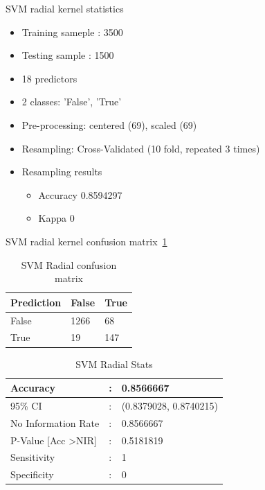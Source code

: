 			SVM radial kernel statistics
				\begin{itemize}
					\item Training sameple : 	3500
					\item Testing sample : 1500
					\item 18 predictors
					\item 2 classes: 'False', 'True' 
					\item Pre-processing: centered (69), scaled (69) 
					\item Resampling: Cross-Validated (10 fold, repeated 3 times) 
					\item Resampling results
					\begin{itemize}
						\item Accuracy  0.8594297
						\item Kappa      0
					\end{itemize}
				\end{itemize}
				
				SVM radial kernel confusion matrix~\ref{svm-r-cm}
					\begin{table}[H]
						\centering
						\caption{SVM Radial confusion matrix}
						\label{svm-r-cm}
						\begin{tabular}{lll}
							\hline
							Prediction & False & True \\
							\hline
							False & 1266 & 68 \\
							\hline
							True & 19 & 147 \\
							\hline
						\end{tabular}
						
					\end{table}
						\begin{table}[H]
							\centering
							\caption{SVM Radial Stats}
							\label{svm-r-stats}
							\begin{tabular}{p{5cm}p{1cm}p{5cm}}
								Accuracy  & : & 0.8566667 \\
								\hline
								95\% CI   & : & (0.8379028, 0.8740215) \\ \hline
								No Information Rate  & : & 0.8566667  \\ \hline
								P-Value {[}Acc \textgreater NIR{]}  & : &  0.5181819 \\ \hline
								Sensitivity  & : & 1 \\ \hline
								Specificity  & : & 0 \\ \hline
								
							\end{tabular}
						\end{table}
			
